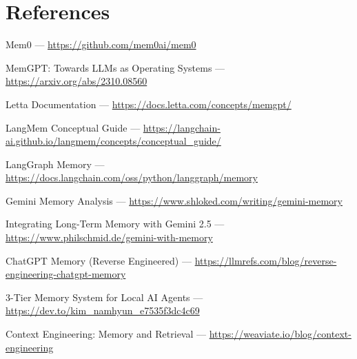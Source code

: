 \documentclass[11pt, letterpaper]{article}
\begin{document}
\section*{References}

\begin{enumerate}[leftmargin=2em, label={[\arabic*]}]
    \item Mem0 --- \url{https://github.com/mem0ai/mem0}
    \item MemGPT: Towards LLMs as Operating Systems --- \url{https://arxiv.org/abs/2310.08560}
    \item Letta Documentation --- \url{https://docs.letta.com/concepts/memgpt/}
    \item LangMem Conceptual Guide --- \url{https://langchain-ai.github.io/langmem/concepts/conceptual_guide/}
    \item LangGraph Memory --- \url{https://docs.langchain.com/oss/python/langgraph/memory}
    \item Gemini Memory Analysis --- \url{https://www.shloked.com/writing/gemini-memory}
    \item Integrating Long-Term Memory with Gemini 2.5 --- \url{https://www.philschmid.de/gemini-with-memory}
    \item ChatGPT Memory (Reverse Engineered) --- \url{https://llmrefs.com/blog/reverse-engineering-chatgpt-memory}
    \item 3-Tier Memory System for Local AI Agents --- \url{https://dev.to/kim_namhyun_e7535f3dc4c69}
    \item Context Engineering: Memory and Retrieval --- \url{https://weaviate.io/blog/context-engineering}
\end{enumerate}
\end{document}
